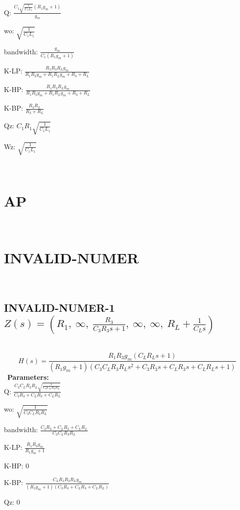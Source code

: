 \documentclass{article}
\begin{document}
Q: $\frac{C_{1} \sqrt{\frac{1}{C_{1} L_{1}}} \left(R_{1} g_{m} + 1\right)}{g_{m}}$\ 

wo: $\sqrt{\frac{1}{C_{1} L_{1}}}$\ 

bandwidth: $\frac{g_{m}}{C_{1} \left(R_{1} g_{m} + 1\right)}$\ 

K-LP: $\frac{R_{1} R_{3} R_{L} g_{m}}{R_{1} R_{3} g_{m} + R_{1} R_{L} g_{m} + R_{3} + R_{L}}$\ 

K-HP: $\frac{R_{1} R_{3} R_{L} g_{m}}{R_{1} R_{3} g_{m} + R_{1} R_{L} g_{m} + R_{3} + R_{L}}$\ 

K-BP: $\frac{R_{3} R_{L}}{R_{3} + R_{L}}$\ 

Qz: $C_{1} R_{1} \sqrt{\frac{1}{C_{1} L_{1}}}$\ 

Wz: $\sqrt{\frac{1}{C_{1} L_{1}}}$\ 

\ 

\section{AP}\ 
\section{INVALID-NUMER}\ 
\subsection{INVALID-NUMER-1 $Z(s) = \left( R_{1}, \  \infty, \  \frac{R_{3}}{C_{3} R_{3} s + 1}, \  \infty, \  \infty, \  R_{L} + \frac{1}{C_{L} s}\right)$ } \ 
\textbf{\[H(s) = \frac{R_{1} R_{3} g_{m} \left(C_{L} R_{L} s + 1\right)}{\left(R_{1} g_{m} + 1\right) \left(C_{3} C_{L} R_{3} R_{L} s^{2} + C_{3} R_{3} s + C_{L} R_{3} s + C_{L} R_{L} s + 1\right)}\] } \ 
\textbf{Parameters:}\\ 

Q: $\frac{C_{3} C_{L} R_{3} R_{L} \sqrt{\frac{1}{C_{3} C_{L} R_{3} R_{L}}}}{C_{3} R_{3} + C_{L} R_{3} + C_{L} R_{L}}$\ 

wo: $\sqrt{\frac{1}{C_{3} C_{L} R_{3} R_{L}}}$\ 

bandwidth: $\frac{C_{3} R_{3} + C_{L} R_{3} + C_{L} R_{L}}{C_{3} C_{L} R_{3} R_{L}}$\ 

K-LP: $\frac{R_{1} R_{3} g_{m}}{R_{1} g_{m} + 1}$\ 

K-HP: $0$\ 

K-BP: $\frac{C_{L} R_{1} R_{3} R_{L} g_{m}}{\left(R_{1} g_{m} + 1\right) \left(C_{3} R_{3} + C_{L} R_{3} + C_{L} R_{L}\right)}$\ 

Qz: $0$\ 
\end{document}

